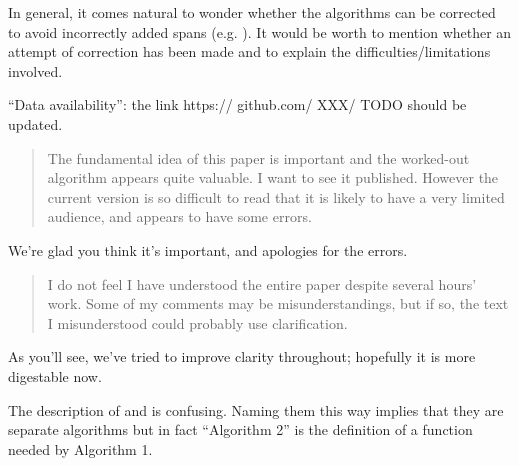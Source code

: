 
\begin{point}{}
In general, it comes natural to wonder whether the algorithms can be corrected to avoid incorrectly added spans
(e.g. \revref). %
It would be worth to mention whether an attempt of correction has been made and to explain the difficulties/limitations involved.
\end{point}


\begin{point}{\revref} %
 ``Data availability'': the link https:// github.com/ XXX/ TODO should be updated.
\end{point}





\begin{quote}
The fundamental idea of this paper is important and the worked-out
algorithm appears quite valuable. I want to see it published. However
the current version is so difficult to read that it is likely to
have a very limited audience, and appears to have some errors.
\end{quote}

We're glad you think it's important, and apologies for the errors.

\begin{quote}
I do not feel I have understood the entire paper despite several
hours' work. Some of my comments may be misunderstandings, but if
so, the text I misunderstood could probably use clarification.
\end{quote}

As you'll see, we've tried to improve clarity throughout;
hopefully it is more digestable now.

\begin{point}{} %
The description of  and  is confusing.
Naming them this way implies that they are separate algorithms but
in fact ``Algorithm 2'' is the definition of a function needed by
Algorithm 1.
\end{point}

